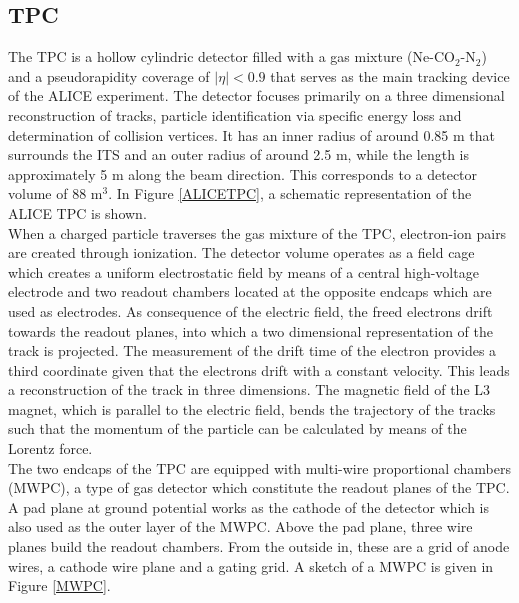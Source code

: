 \documentclass[12pt,a4paper]{report}
\begin{document}
\subsection{TPC}
The TPC is a hollow cylindric detector filled with a gas mixture (Ne-CO$_2$-N$_2$) and a pseudorapidity coverage of $|\eta| < 0.9 $  that serves as the main tracking device of the ALICE experiment. The detector focuses primarily on a three dimensional reconstruction of tracks, particle identification via specific energy loss and determination of collision vertices. It has an inner radius of around 0.85 m that surrounds the ITS and an outer radius of around 2.5 m, while the length is approximately 5 m along the beam direction. This corresponds to a detector volume of 88 m$^3$. In Figure \ref{ALICETPC}, a schematic representation of the ALICE TPC is shown. \\
When a charged particle traverses the gas mixture of the TPC, electron-ion pairs are created through ionization. The detector volume operates as a field cage which creates a uniform electrostatic field by means of a central high-voltage electrode and two readout chambers located at the opposite endcaps which are used as electrodes. As consequence of the electric field, the freed electrons drift towards the readout planes, into which a two dimensional representation of the track is projected. The measurement of the drift time of the electron provides a third coordinate given that the electrons drift with a constant velocity. This leads a reconstruction of the track in three dimensions. The magnetic field of the L3 magnet, which is parallel to the electric field, bends the trajectory of the tracks such that the momentum of the particle can be calculated by means of the Lorentz force.\\
The two endcaps of the TPC are equipped with multi-wire proportional chambers (MWPC), a type of gas detector which constitute the readout planes of the TPC. A pad plane at ground potential works as the cathode of the detector which is also used as the outer layer of the MWPC. Above the pad plane, three wire planes build the readout chambers. From the outside in, these are a grid of anode wires, a cathode wire plane and a gating grid. A sketch of a MWPC is given in Figure \ref{MWPC}. \\
\end{document}
